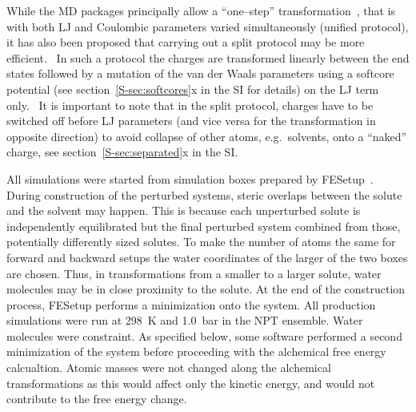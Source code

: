 \documentclass[journal=jctcce,manuscript=article]{achemso}
\begin{document}
While the MD packages principally allow a ``one--step''
transformation~\cite{steinbrecher_soft-core_2011},
that is with both LJ and Coulombic parameters varied
simultaneously (unified protocol), it has also been proposed that carrying out a
split protocol may be more efficient.~\cite{Deng-2004, naden_linear_2014, naden_linear_2015}
In such a protocol the charges are transformed
linearly between the end states followed by a mutation of the van der
Waals parameters using a softcore
potential (see section~\ref{S-sec:softcores}x in the
SI for details) on the LJ term only.~\cite{beutler_avoiding_1994,
  zacharias_separationshifted_1994}  It is important to note that in the split protocol, charges have to be switched off before LJ parameters (and vice versa
for the transformation in opposite direction) to avoid collapse of
other atoms, e.g.\ solvents, onto a ``naked''
charge,\cite{pitera_comparison_2002, anwar_robust_2005,
steinbrecher_soft-core_2011} see section~\ref{S-sec:separated}x in the SI.

All simulations were started from simulation boxes prepared by
FESetup~\cite{loeffler_fesetup:_2015}.  During construction of the
perturbed systems, steric overlaps between the solute and the
solvent may happen.  This is because each unperturbed solute is independently
equilibrated but the final perturbed system combined from those, potentially
differently sized solutes.  To make the number of atoms the same for forward
and backward setups the water coordinates of the larger of the two boxes are
chosen.  Thus, in transformations from a smaller to a larger solute, water
molecules may be in close proximity to the solute. At the end of the
construction process, FESetup performs a minimization onto the system.
All production simulations were run at \SI{298}{K} and \SI{1.0}{bar}
in the NPT ensemble.  Water molecules were constraint.  As specified
below, some software performed a second minimization of the system
before proceeding with the alchemical free energy calcualtion.  Atomic
masses were not changed along the alchemical transformations as this
would affect only the kinetic energy, and would not contribute to the
free energy change.

%
\end{document}
